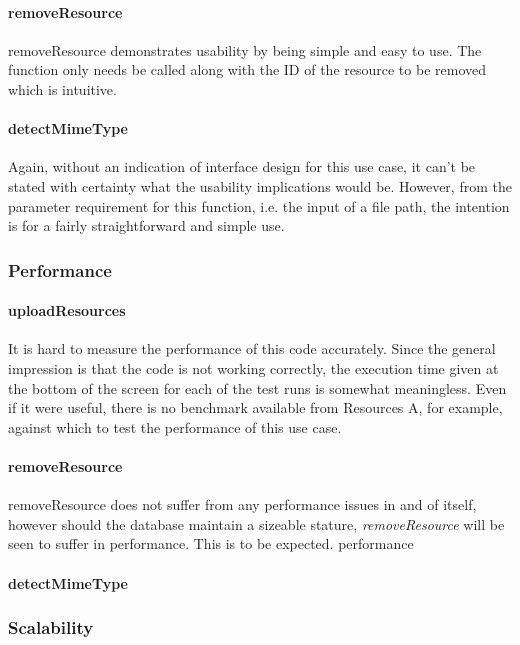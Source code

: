 \documentclass[a4paper]{article}
\begin{document}
\paragraph{removeResource}
removeResource demonstrates usability by being simple and easy to use. The function only needs be called along with the ID of the resource to be removed which is intuitive.

\paragraph{detectMimeType}
Again, without an indication of interface design for this use case, it can’t be stated with certainty what the usability implications would be. However, from the parameter requirement for this function, i.e. the input of a file path, the intention is for a fairly straightforward and simple use.

\subsubsection {Performance}

\paragraph{uploadResources}
It is hard to measure the performance of this code accurately. Since the general impression is that the code is not working correctly, the execution time given at the bottom of the screen for each of the test runs is somewhat meaningless. Even if it were useful, there is no benchmark available from Resources A, for example, against which to test the performance of this use case.

\paragraph{removeResource}
removeResource does not suffer from any performance issues in and of itself, however should the database maintain a sizeable stature, \textit{removeResource} will be seen to suffer in performance. This is to be expected.
performance

\paragraph{detectMimeType}

\subsubsection {Scalability}
\end{document}

